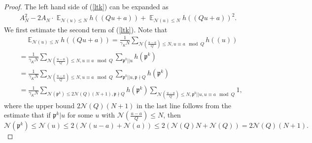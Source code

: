 \documentclass[11pt]{amsart}
\theoremstyle{definition}
\DeclareMathOperator*{\E}{\mathbb{E}}
\newcommand{\NN}{{\mathcal N}}
\newcommand{\mf}{\mathfrak}
\begin{document}
\begin{proof}
The left hand side of (\ref{ltk}) can be expanded as  
\begin{equation}\label{ltk2}
    \begin{split}
       A_{N}^{2}-2A_{N}\cdot \E_{\NN(u) \leq N}h((Qu+a))+\E_{\NN(u) \leq N}h((Qu+a))^{2}.
    \end{split}
\end{equation}
We first estimate the second term of (\ref{ltk}). Note that
\begin{equation}\label{firstTK}
    \begin{split}
        &\quad \E_{\NN(u) \leq N}h((Qu+a))
        =\frac{1}{\gamma_{K} N}\sum_{\NN(\frac{u-a}{Q})\leq N, u\equiv a \mod Q}h((u))
        \\&=\frac{1}{\gamma_{K} N}\sum_{\NN(\frac{u-a}{Q})\leq N, u\equiv a \mod Q}\sum_{\mf p^{k}|| u} h(\mf p^{k})
        \\&=\frac{1}{\gamma_{K} N}\sum_{\NN(\frac{u-a}{Q})\leq N, u\equiv a \mod Q}\sum_{\mf p^{k}|| u, \mf p\nmid Q} h(\mf p^{k})
        \\&=\frac{1}{\gamma_{K} N}\sum_{\NN(\mf p^{k})\leq 2\NN(Q)(N+1), \mf p\nmid Q}h(\mf p^{k})\sum_{\NN(\frac{u-a}{Q})\leq N, \mf p^{k}||u, u\equiv a \mod Q} 1,
    \end{split}
\end{equation}
where the upper bound $2\NN(Q)(N+1)$ in the last line follows from the estimate that if $\mf p^{k}\vert u$ for some $u$ with $\NN(\frac{u-a}{Q})\leq N$, then
$$\NN(\mf p^{k})\leq \NN(u)\leq 2(\NN(u-a)+\NN(a))\leq 2(\NN(Q)N+\NN(Q))=2\NN(Q)(N+1).$$




\end{proof}
\end{document}
